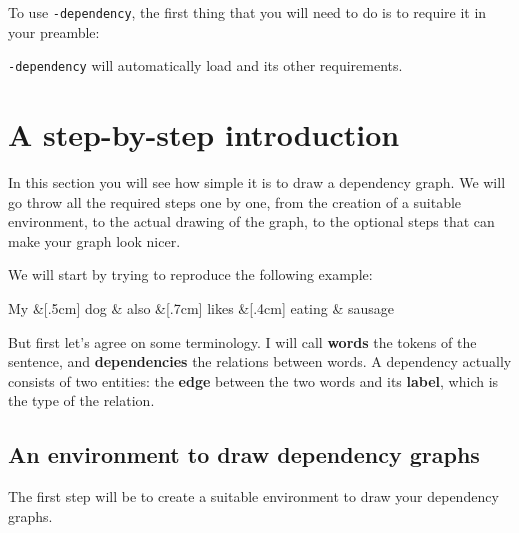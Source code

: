 \documentclass[a4paper]{ltxdoc}
\def\pkgname{\tikzname{}\texttt{-dependency}}
\begin{document}
To use \pkgname{}, the first thing that you will need to do is to require it in your preamble:
\begin{codeexample}
\usepackage{tikz-dependency}
\end{codeexample}
\pkgname{} will automatically load \tikzname{} and its other requirements.


\section{A step-by-step introduction}\label{sec:stepbystep}

In this section you will see how simple it is to draw a dependency graph. We will go throw all the required steps one by one, from the creation of a suitable environment, to the actual drawing of the graph, to the optional steps that can make your graph look nicer.

We will start by trying to reproduce the following example:

\begin{center}
      \begin{dependency}
         \begin{deptext}[column sep=0.2cm]
            My \&[.5cm] dog \& also \&[.7cm] likes \&[.4cm] eating \& sausage \\
         \end{deptext}
      \end{dependency}
\end{center}

But first let's agree on some terminology. I will call \textbf{words} the tokens of the sentence, and \textbf{dependencies} the relations between words. A dependency actually consists of two entities: the \textbf{edge} between the two words and its \textbf{label}, which is the type of the relation.

\subsection{An environment to draw dependency graphs}

The first step will be to create a suitable environment to draw your dependency graphs.
\end{document}
